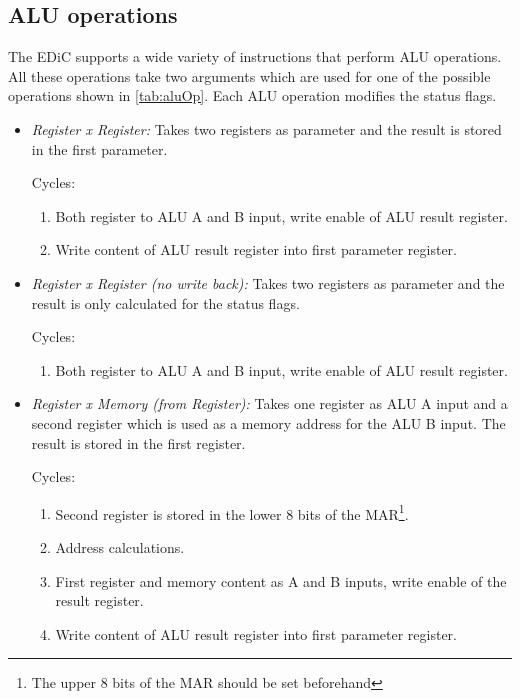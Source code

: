 \subsection{\gls{ALU} operations}
The \gls{EDiC} supports a wide variety of instructions that perform \gls{ALU} operations.
All these operations take two arguments which are used for one of the possible operations shown in \cref{tab:aluOp}.
Each \gls{ALU} operation modifies the status flags.
\begin{itemize}
  \item \emph{Register x Register:} Takes two registers as parameter and the result is stored in the first parameter.

  Cycles:
  \begin{enumerate}
    \item Both register to \gls{ALU} A and B input, write enable of \gls{ALU} result register.
    \item Write content of \gls{ALU} result register into first parameter register.
  \end{enumerate}

  \item \emph{Register x Register (no write back):} Takes two registers as parameter and the result is only calculated for the status flags.

  Cycles:
  \begin{enumerate}
    \item Both register to \gls{ALU} A and B input, write enable of \gls{ALU} result register.
  \end{enumerate}

  \item \emph{Register x Memory (from Register):} Takes one register as \gls{ALU} A input and a second register which is used as a memory address for the \gls{ALU} B input.
  The result is stored in the first register.

  Cycles:
  \begin{enumerate}
    \item Second register is stored in the lower 8 bits of the \gls{MAR}\footnote{The upper 8 bits of the \gls{MAR} should be set beforehand}.
    \item Address calculations.
    \item First register and memory content as A and B inputs, write enable of the result register.
    \item Write content of \gls{ALU} result register into first parameter register.
  \end{enumerate}


\end{itemize}
